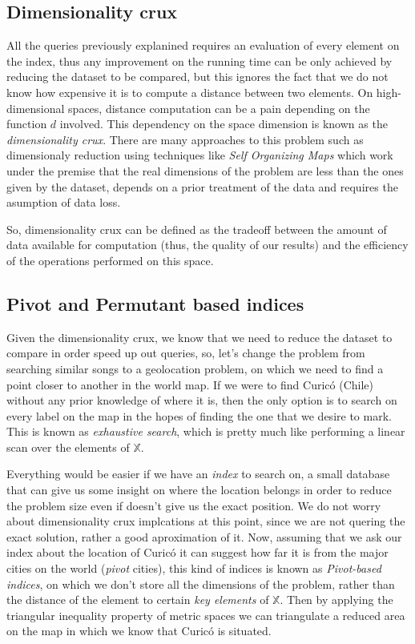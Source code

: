 \subsection{Dimensionality crux}
All the queries previously explanined requires an evaluation of every element on the index, thus any improvement on
the running time can be only achieved by reducing the dataset to be compared, but this ignores the fact that we do not know
how expensive it is to compute a distance between two elements. On high-dimensional spaces, distance computation can be a pain
depending on the function $d$ involved. This dependency on the space dimension is known as the \emph{dimensionality crux}. There are 
many approaches to this problem such as dimensionaly reduction using techniques like \emph{Self Organizing Maps} which work
under the premise that the real dimensions of the problem are less than the ones given by the dataset, depends on a
prior treatment of the data and requires the asumption of data loss.

So, dimensionality crux can be defined as the tradeoff between the amount of data available for computation (thus, the quality of our results) and
the efficiency of the operations performed on this space.

\subsection{Pivot and Permutant based indices}
Given the dimensionality crux, we know that we need to reduce the dataset to compare in order speed up out queries, so, let's change the problem from
searching similar songs to a geolocation problem, on which we need to find a point closer to another in the world map. If we were to
find Curicó (Chile) without any prior knowledge of where it is, then the only option is to search on every label on the map
in the hopes of finding the one that we desire to mark. This is known as \emph{exhaustive search}, which is pretty much like performing a 
linear scan over the elements of $\mathbb{X}$.

Everything would be easier if we have an \emph{index} to search on, a small database that can give us some insight on where
the location belongs in order to reduce the problem size even if doesn't give us the exact position. We do not worry about dimensionality crux
implcations at this point, since we are not quering the exact solution, rather a good aproximation of it. Now, assuming that we ask
our index about the location of Curicó it can suggest how far it is from the major cities on the world (\emph{pivot} cities), this kind of indices
is known as \emph{Pivot-based indices}, on which we don't store all the dimensions of the problem, rather than the distance of the element to certain
\emph{key elements} of $\mathbb{X}$. Then by applying the triangular inequality property of metric spaces we can triangulate a reduced
area on the map in which we know that Curicó is situated.

